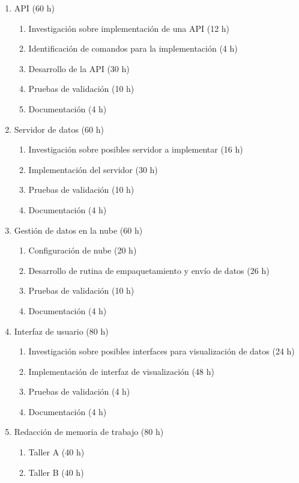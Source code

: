\documentclass[
11pt, %
]{charter}
\begin{document}
\begin{enumerate}
\item API (60 h)
	\begin{enumerate}
	\item Investigación sobre implementación de una API (12 h)
	\item Identificación de comandos para la implementación (4 h)
	\item Desarrollo de la API (30 h)
	\item Pruebas de validación (10 h)
	\item Documentación (4 h)
	\end{enumerate}

\item Servidor de datos (60 h)
	\begin{enumerate}
	\item Investigación sobre posibles servidor a implementar (16 h)	
	\item Implementación del servidor (30 h)
	\item Pruebas de validación (10 h)
	\item Documentación (4 h)
	\end{enumerate}
	
\item Gestión de datos en la nube (60 h)
	\begin{enumerate}
	\item Configuración de nube (20 h)
	\item Desarrollo de rutina de empaquetamiento y envío de datos (26 h)
	\item Pruebas de validación (10 h)
	\item Documentación (4 h)
	\end{enumerate}	

\item Interfaz de usuario (80 h)
	\begin{enumerate}
	\item Investigación sobre posibles interfaces para visualización de datos (24 h)
	\item Implementación de interfaz de visualización (48 h)
	\item Pruebas de validación (4 h)
	\item Documentación (4 h)
	\end{enumerate}		

\item Redacción de memoria de trabajo (80 h)
	\begin{enumerate}
	\item Taller A (40 h)
	\item Taller B (40 h)
	\end{enumerate}

	
\end{enumerate}
\end{document}
